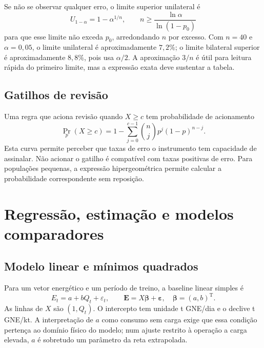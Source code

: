 Se não se observar qualquer erro, o limite superior unilateral é
\begin{equation}
U_{1-\alpha}=1-\alpha^{1/n},
\qquad n\geq\frac{\ln\alpha}{\ln(1-p_0)}
\label{eq:mat-zero-erros}
\end{equation}
para que esse limite não exceda $p_0$, arredondando $n$ por excesso. Com $n=40$ e $\alpha=0{,}05$, o limite unilateral é aproximadamente $7{,}2\%$; o limite bilateral superior é aproximadamente $8{,}8\%$, pois usa $\alpha/2$. A aproximação $3/n$ é útil para leitura rápida do primeiro limite, mas a expressão exata deve sustentar a tabela.

\subsection{Gatilhos de revisão}
\label{sec:mat-gatilhos}
Uma regra que aciona revisão quando $X\geq c$ tem probabilidade de acionamento
\begin{equation}
\Pr_p(X\geq c)=1-\sum_{j=0}^{c-1}\binom njp^j(1-p)^{n-j}.
\label{eq:mat-gatilho}
\end{equation}
Esta curva permite perceber que taxas de erro o instrumento tem capacidade de assinalar. Não acionar o gatilho é compatível com taxas positivas de erro. Para populações pequenas, a expressão hipergeométrica permite calcular a probabilidade correspondente sem reposição.


\section{Regressão, estimação e modelos comparadores}
\label{sec:mat-regressao}

\subsection{Modelo linear e mínimos quadrados}
\label{sec:mat-ols}
Para um vetor energético e um período de treino, a baseline linear simples
é
\begin{equation}
E_t=a+bQ_t+\varepsilon_t,
\qquad \boldsymbol E=X\boldsymbol\beta+\boldsymbol\varepsilon,
\quad \boldsymbol\beta=(a,b)^{\mathrm T}.
\label{eq:mat-modelo-linear}
\end{equation}
As linhas de $X$ são $(1,Q_t)$. O intercepto tem unidade t GNE/dia e o declive t GNE/kt. A interpretação de $a$ como consumo sem carga exige que essa condição pertença ao domínio físico do modelo; num ajuste restrito à operação a carga elevada, $a$ é sobretudo um parâmetro da reta extrapolada.

